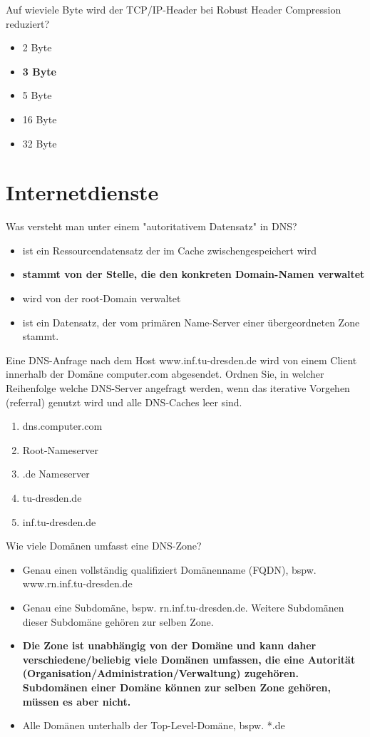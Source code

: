 \documentclass{article}
\begin{document}
	Auf wieviele Byte wird der TCP/IP-Header bei Robust Header Compression reduziert?
	\begin{itemize}
		\item 2 Byte
		\item \textbf{3 Byte}
		\item 5 Byte
		\item 16 Byte
		\item 32 Byte
	\end{itemize}
	
	\section{Internetdienste}
	
	Was versteht man unter einem "autoritativem Datensatz" in DNS?
	\begin{itemize}
		\item ist ein Ressourcendatensatz der im Cache zwischengespeichert wird 
		\item \textbf{stammt von der Stelle, die den konkreten Domain-Namen verwaltet }
		\item wird von der root-Domain verwaltet 
		\item ist ein Datensatz, der vom primären Name-Server einer übergeordneten Zone stammt. 
	\end{itemize}

	Eine DNS-Anfrage nach dem Host www.inf.tu-dresden.de wird von einem Client innerhalb der Domäne computer.com abgesendet. Ordnen Sie, in welcher Reihenfolge welche DNS-Server angefragt werden, wenn das iterative Vorgehen (referral) genutzt wird und alle DNS-Caches leer sind.
	\begin{enumerate}
		\item dns.computer.com 
		\item Root-Nameserver 
		\item .de Nameserver 
		\item tu-dresden.de 
		\item inf.tu-dresden.de 
	\end{enumerate}

	Wie viele Domänen umfasst eine DNS-Zone? 
	\begin{itemize}
		\item Genau einen vollständig qualifiziert Domänenname (FQDN), bspw. www.rn.inf.tu-dresden.de
		\item Genau eine Subdomäne, bspw. rn.inf.tu-dresden.de. Weitere Subdomänen dieser Subdomäne gehören zur selben Zone. 
		\item \textbf{Die Zone ist unabhängig von der Domäne und kann daher verschiedene/beliebig viele Domänen umfassen, die eine Autorität (Organisation/Administration/Verwaltung) zugehören. Subdomänen einer Domäne können zur selben Zone gehören, müssen es aber nicht.}
		\item Alle Domänen unterhalb der Top-Level-Domäne, bspw. *.de 
	\end{itemize}
\end{document}
